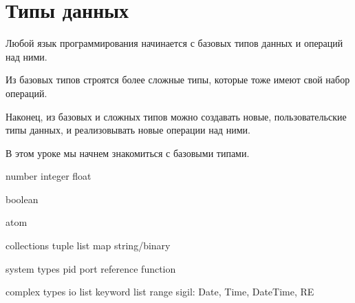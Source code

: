 \chapter{Типы данных}

Любой язык программирования начинается с базовых типов данных и операций над ними.

Из базовых типов строятся более сложные типы, которые тоже имеют свой набор операций.

Наконец, из базовых и сложных типов можно создавать новые, пользовательские типы данных, и реализовывать новые операции над ними.

В этом уроке мы начнем знакомиться с базовыми типами.

number
  integer
  float

boolean

atom

collections
  tuple
  list
  map
  string/binary

system types
  pid
  port
  reference
  function
  
complex types
  io list
  keyword list
  range
  sigil: Date, Time, DateTime, RE
  
